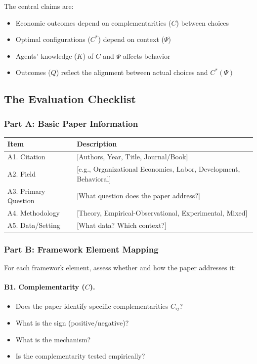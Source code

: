 \documentclass[12pt,a4paper]{article}
\begin{document}
The central claims are:
\begin{itemize}
  \item Economic outcomes depend on complementarities ($C$) between choices
  \item Optimal configurations ($C^*$) depend on context ($\Psi$)
  \item Agents' knowledge ($K$) of $C$ and $\Psi$ affects behavior
  \item Outcomes ($Q$) reflect the alignment between actual choices and $C^*(\Psi)$
\end{itemize}

\subsection{The Evaluation Checklist}

\subsubsection{Part A: Basic Paper Information}

\begin{center}
\renewcommand{\arraystretch}{1.3}
\begin{tabular}{lp{10cm}}
\hline
\textbf{Item} & \textbf{Description} \\
\hline
A1. Citation & [Authors, Year, Title, Journal/Book] \\
A2. Field & [e.g., Organizational Economics, Labor, Development, Behavioral] \\
A3. Primary Question & [What question does the paper address?] \\
A4. Methodology & [Theory, Empirical-Observational, Experimental, Mixed] \\
A5. Data/Setting & [What data? Which context?] \\
\hline
\end{tabular}
\end{center}

\subsubsection{Part B: Framework Element Mapping}

For each framework element, assess whether and how the paper addresses it:

\paragraph{B1. Complementarity ($C$).}
\begin{itemize}
  \item Does the paper identify specific complementarities $C_{ij}$?
  \item What is the sign (positive/negative)?
  \item What is the mechanism?
  \item Is the complementarity tested empirically?
\end{itemize}
\end{document}
